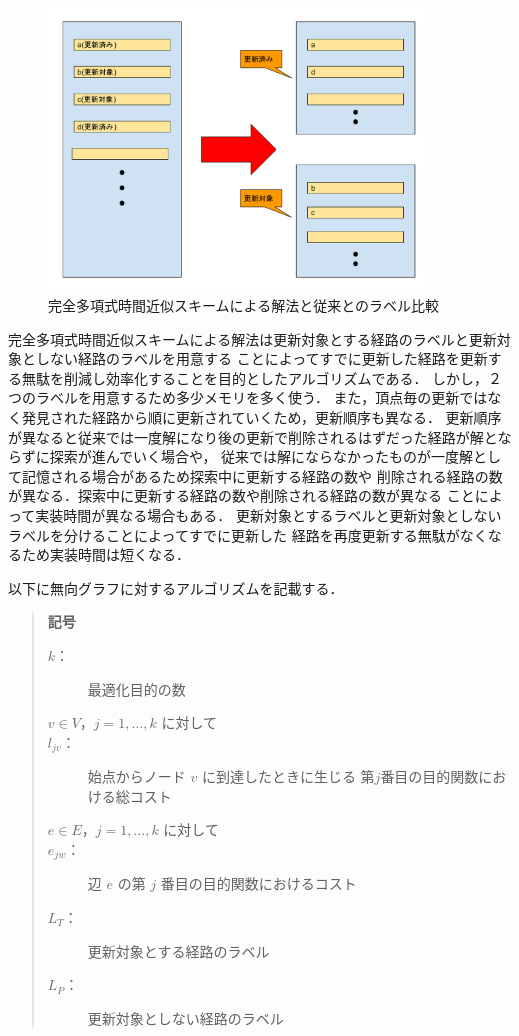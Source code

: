 \documentclass[12pt]{optlab-bachelor}
\begin{document}
\begin{figure}[htbp]
  \centering
  \caption{完全多項式時間近似スキームによる解法と従来とのラベル比較}
  \includegraphics[width=10.0cm]{fig/fig1.pdf}
\end{figure}

完全多項式時間近似スキームによる解法は更新対象とする経路のラベルと更新対象としない経路のラベルを用意する
ことによってすでに更新した経路を更新する無駄を削減し効率化することを目的としたアルゴリズムである．
しかし，２つのラベルを用意するため多少メモリを多く使う．
また，頂点毎の更新ではなく発見された経路から順に更新されていくため，更新順序も異なる．
更新順序が異なると従来では一度解になり後の更新で削除されるはずだった経路が解とならずに探索が進んでいく場合や，
従来では解にならなかったものが一度解として記憶される場合があるため探索中に更新する経路の数や
削除される経路の数が異なる．探索中に更新する経路の数や削除される経路の数が異なる
ことによって実装時間が異なる場合もある．
更新対象とするラベルと更新対象としないラベルを分けることによってすでに更新した
経路を再度更新する無駄がなくなるため実装時間は短くなる．


以下に無向グラフに対するアルゴリズムを記載する．

\begin{quote}
  \textbf{記号}
  \begin{description}
    \item[$k$：] 最適化目的の数
    \item[$v \in V$，$j = 1 , \ldots , k$ に対して]
    \item[$l_{jv}$：] 始点からノード $v$ に到達したときに生じる
    第$j$番目の目的関数における総コスト
    \item[$e \in E$，$j = 1 , \ldots , k$ に対して]
    \item[$e_{jw}$：] 辺 $e$ の第 $j$ 番目の目的関数におけるコスト
    \item[$L_T$：] 更新対象とする経路のラベル
    \item[$L_P$：] 更新対象としない経路のラベル
  \end{description}
\end{quote}
\end{document}
